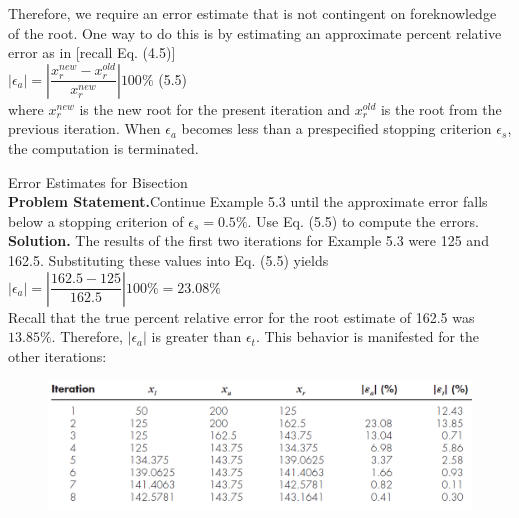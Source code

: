 \documentclass[../main.tex]{subfiles}
\begin{document}
Therefore, we require an error estimate that is not contingent on foreknowledge of the
root. One way to do this is by estimating an approximate percent relative error as in [recall
Eq. (4.5)]\\

$\left\lvert \epsilon_a \right\rvert = \left\lvert \dfrac{x^{new}_r - x^{old}_r}{x^{new}_r} \right\rvert 100\%$
\hfill (5.5)\\

\noindent where $x^{new}_r$ is the new root for the present iteration and $x^{old}_r$ is the root 
from the previous iteration. When $\epsilon_a$ becomes less than a prespecified stopping criterion 
$\epsilon_s$, the computation is terminated.\\

\begin{example} Error Estimates for Bisection\\
    
    \noindent\textbf{Problem Statement.}\quad Continue Example 5.3 until the approximate error falls below a
    stopping criterion of $\epsilon_s = 0.5\%$. Use Eq. (5.5) to compute the errors.\\

    \noindent\textbf{Solution.} The results of the first two iterations for Example 5.3 were 125 and 162.5. Substituting
    these values into Eq. (5.5) yields\\

    $\left\lvert \epsilon_a \right\rvert = \left\lvert \dfrac{162.5-125}{162.5} \right\rvert 100\% = 23.08\%$\\

    \noindent Recall that the true percent relative error for the root estimate of 162.5 was $13.85\%$. Therefore,
    $\left\lvert \epsilon_a \right\rvert$ is greater than $\epsilon_t$. This behavior is manifested for the other iterations:\\

    \begin{figure}[h]
        \includegraphics[width=0.75\linewidth]{./images/example_5_4_1}
    \end{figure}
    \vspace{1cm}
    

\end{example}
\end{document}
